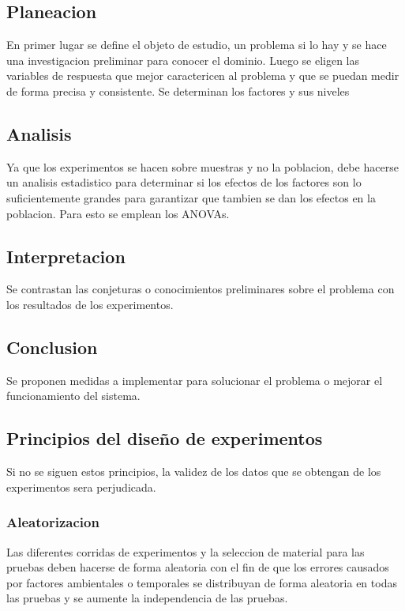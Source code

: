 \documentclass[a4paper]{article}
\begin{document}
\subsection*{Planeacion}
En primer lugar se define el objeto de estudio, un problema si lo hay y se hace una investigacion preliminar para
conocer el dominio.
Luego se eligen las variables de respuesta que mejor caractericen al problema y que se puedan medir de forma
precisa y consistente.
Se determinan los factores y sus niveles

\subsection*{Analisis}
Ya que los experimentos se hacen sobre muestras y no la poblacion, debe hacerse un analisis estadistico para
determinar si los efectos de los factores son lo suficientemente grandes para garantizar que tambien se dan los 
efectos en la poblacion. Para esto se emplean los ANOVAs.

\subsection*{Interpretacion}
Se contrastan las conjeturas o conocimientos preliminares sobre el problema con los resultados de los experimentos.

\subsection*{Conclusion}
Se proponen medidas a implementar para solucionar el problema o mejorar el funcionamiento del sistema.

\subsection*{Principios del diseño de experimentos}
Si no se siguen estos principios, la validez de los datos que se obtengan de los experimentos sera perjudicada.

\subsubsection*{Aleatorizacion}
Las diferentes corridas de experimentos y la seleccion de material para las pruebas deben hacerse de forma 
aleatoria con el fin de que los errores causados por factores ambientales o temporales se distribuyan de forma 
aleatoria en todas las pruebas y se aumente la independencia de las pruebas.
\end{document}
